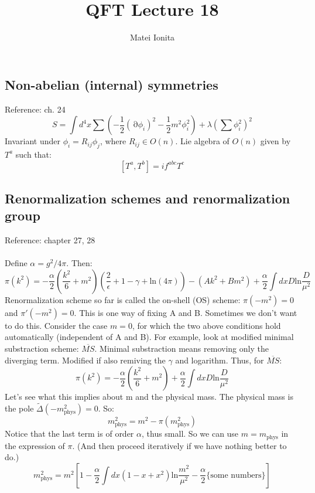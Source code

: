\documentclass[12 pt]{article}
\title{QFT Lecture 18}
\author{Matei Ionita}
\DeclareMathOperator {\p} {\partial}
\begin{document}
  \maketitle

\subsection*{Non-abelian (internal) symmetries}
Reference: ch. 24
\[       S = \int d^4 x \sum \left(  -\frac{1}{2} (\p \phi_i)^2 - \frac{1}{2} m^2 \phi_i^2  \right)   + \lambda \left(  \sum \phi_i^2  \right)^2  \]
Invariant under $\phi_i = R_{ij} \phi_j$, where $R_{ij} \in O(n)$. Lie algebra of $O(n)$ given by $T^a$ such that:
\[        [T^a, T^b ] = i f^ {abc} T^c     \]



\subsection*{Renormalization schemes and renormalization group}
Reference: chapter 27, 28
\\
\\
Define $\alpha = g^2/4\pi$. Then:
\[          \pi(k^2) = - \frac{\alpha}{2} \left(\frac{k^2}{6} + m^2 \right) \left( \frac{2}{\epsilon} + 1 - \gamma + \text{ln}(4\pi) \right) - (Ak^2 + Bm^2)  + \frac{\alpha}{2} \int dx D \text{ln} \frac{D}{\mu^2} \]
Renormalization scheme so far is called the on-shell (OS) scheme: $\pi(-m^2) = 0$ and $\pi'(-m^2) = 0$. This is one way of fixing A and B. Sometimes we don't want to do this. Consider the case $m = 0$, for which the two above conditions hold automatically (independent of A and B). For example, look at modified minimal substraction scheme: $\overline{MS}$. Minimal substraction means removing only the diverging term. Modified if also remiving the $\gamma$ and logarithm. Thus, for $\overline{MS}$:
\[   \pi(k^2) = - \frac{\alpha}{2} \left(\frac{k^2}{6} + m^2 \right)   + \frac{\alpha}{2} \int dx D \text{ln} \frac{D}{\mu^2} \]
Let's see what this implies about m and the physical mass. The physical mass is the pole $\tilde \Delta(-m_{\text{phys}}^2) = 0$. So:
\[          m_{\text{phys}}^2 = m^2 - \pi(m_{\text{phys}}^2)     \]
Notice that the last term is of order $\alpha$, thus small. So we can use $m=m_{\text{phys}}$ in the expression of $\pi$. (And then proceed iteratively if we have nothing better to do.)
\[           m_{\text{phys}}^2 = m^2 \left[   1 - \frac{\alpha}{2} \int dx (1 - x +x^2) \text{ln} \frac{m^2}{\mu^2}  - \frac{\alpha}{2} \{\text{some numbers}\}  \right]        \]
\end{document}
